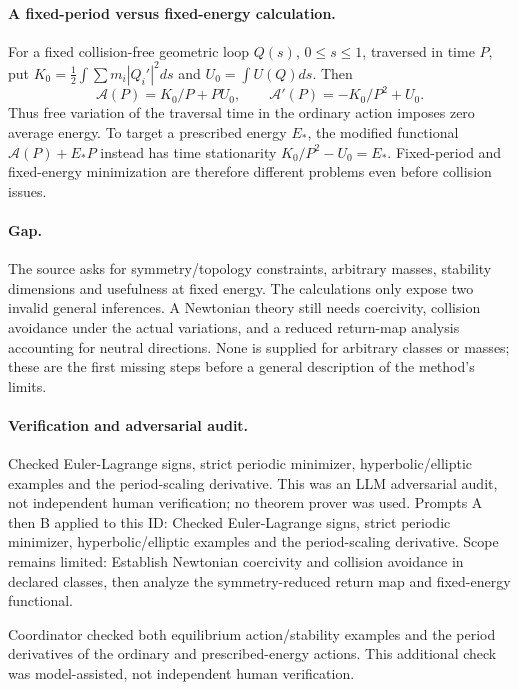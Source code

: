 \documentclass[11pt]{article}
\begin{document}
\paragraph{A fixed-period versus fixed-energy calculation.}For a fixed collision-free geometric loop \(Q(s)\), \(0\le s\le1\), traversed in time \(P\), put \(K_0=\tfrac12\int\sum m_i|Q_i'|^2ds\) and \(U_0=\int U(Q)ds\). Then
\[\mathcal A(P)=K_0/P+PU_0,\qquad \mathcal A'(P)=-K_0/P^2+U_0.
\]
Thus free variation of the traversal time in the ordinary action imposes zero average energy. To target a prescribed energy \(E_*\), the modified functional \(\mathcal A(P)+E_*P\) instead has time stationarity \(K_0/P^2-U_0=E_*\). Fixed-period and fixed-energy minimization are therefore different problems even before collision issues.
\paragraph{Gap.}The source asks for symmetry/topology constraints, arbitrary masses, stability dimensions and usefulness at fixed energy. The calculations only expose two invalid general inferences. A Newtonian theory still needs coercivity, collision avoidance under the actual variations, and a reduced return-map analysis accounting for neutral directions. None is supplied for arbitrary classes or masses; these are the first missing steps before a general description of the method's limits.

\paragraph{Verification and adversarial audit.}
Checked Euler-Lagrange signs, strict periodic minimizer, hyperbolic/elliptic examples and the period-scaling derivative. This was an LLM adversarial audit, not independent human verification; no theorem prover was used. Prompts A then B applied to this ID: Checked Euler-Lagrange signs, strict periodic minimizer, hyperbolic/elliptic examples and the period-scaling derivative. Scope remains limited: Establish Newtonian coercivity and collision avoidance in declared classes, then analyze the symmetry-reduced return map and fixed-energy functional.

Coordinator checked both equilibrium action/stability examples and the period derivatives of the ordinary and prescribed-energy actions. This additional check was model-assisted, not independent human verification.
\end{document}
